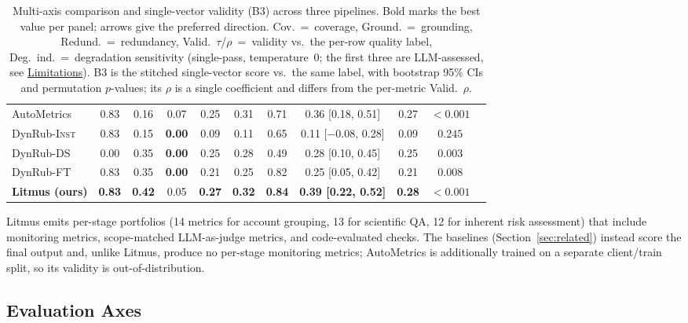 \documentclass[11pt]{article}
\begin{document}
\begin{table}[t]
{\begin{tabular}{lcccccccccc}
AutoMetrics & 0.83 & 0.16 & 0.07 & 0.25 & 0.31 & 0.71 & 0.36 [0.18, 0.51] & 0.27 & $<\!0.001$ \\
DynRub-\textsc{Inst} & 0.83 & 0.15 & \textbf{0.00} & 0.09 & 0.11 & 0.65 & 0.11 [$-0.08$, 0.28] & 0.09 & $0.245$ \\
DynRub-\textsc{DS} & 0.00 & 0.35 & \textbf{0.00} & 0.25 & 0.28 & 0.49 & 0.28 [0.10, 0.45] & 0.25 & $0.003$ \\
DynRub-\textsc{FT} & 0.83 & 0.35 & \textbf{0.00} & 0.21 & 0.25 & 0.82 & 0.25 [0.05, 0.42] & 0.21 & $0.008$ \\
\textbf{Litmus (ours)} & \textbf{0.83} & \textbf{0.42} & 0.05 & \textbf{0.27} & \textbf{0.32} & \textbf{0.84} & \textbf{0.39 [0.22, 0.52]} & \textbf{0.28} & $<\!0.001$ \\
\bottomrule
\end{tabular}%
}
\caption{Multi-axis comparison and single-vector validity (B3) across three
pipelines. Bold marks the best value per panel; arrows give the preferred
direction. Cov.~=~coverage, Ground.~=~grounding, Redund.~=~redundancy,
Valid.~$\tau$/$\rho$~=~validity vs.\ the per-row quality label, Deg.\ ind.~=~degradation
sensitivity (single-pass, temperature~0; the first three are LLM-assessed, see
\hyperref[sec:limitations]{Limitations}). B3 is the stitched single-vector score vs.\ the
same label, with bootstrap 95\% CIs and permutation $p$-values; its $\rho$ is a
single coefficient and differs from the per-metric Valid.\ $\rho$.}
\label{tab:main}
\end{table}

Litmus emits per-stage portfolios (14 metrics for account grouping, 13 for scientific QA, 12 for inherent risk assessment) that include monitoring metrics, scope-matched LLM-as-judge metrics, and code-evaluated checks. The baselines (Section~\ref{sec:related}) instead score the final output and, unlike Litmus, produce no per-stage monitoring metrics; AutoMetrics is additionally trained on a separate client/train split, so its validity is out-of-distribution.

\subsection{Evaluation Axes}
\label{sec:evaluation_axes}
\end{document}
